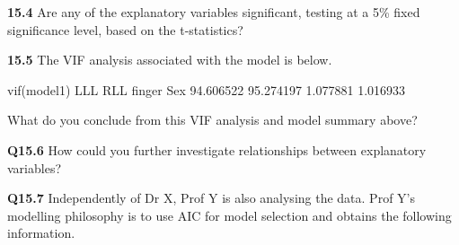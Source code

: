 \documentclass[
  oneside]{krantz}
\newenvironment{Shaded}{\begin{snugshade}}{\end{snugshade}}
\newcommand{\FloatTok}[1]{\textcolor[rgb]{0.00,0.00,0.81}{#1}}
\newcommand{\FunctionTok}[1]{\textcolor[rgb]{0.00,0.00,0.00}{#1}}
\newcommand{\NormalTok}[1]{#1}
\begin{document}
\textbf{15.4} Are any of the explanatory variables significant, testing at a 5\% fixed significance level, based on the t-statistics?

\textbf{15.5} The VIF analysis associated with the model is below.

\begin{Shaded}
\begin{Highlighting}[]
\FunctionTok{vif}\NormalTok{(model1)}
\NormalTok{      LLL       RLL    finger       Sex }
\FloatTok{94.606522} \FloatTok{95.274197}  \FloatTok{1.077881}  \FloatTok{1.016933}
\end{Highlighting}
\end{Shaded}

What do you conclude from this VIF analysis and model summary above?

\textbf{Q15.6} How could you further investigate relationships between explanatory variables?

\textbf{Q15.7} Independently of Dr X, Prof Y is also analysing the data. Prof Y's modelling philosophy is to use AIC for model selection and obtains the following information.
\end{document}
